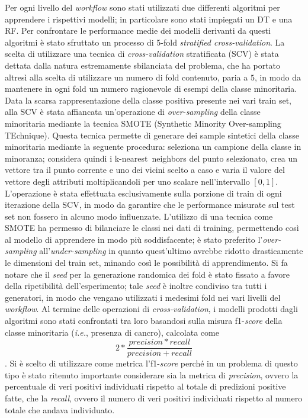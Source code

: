 Per ogni livello del \textit{workflow} sono stati utilizzati due differenti algoritmi per apprendere i rispettivi modelli; in particolare sono stati impiegati un DT e una RF.
Per confrontare le performance medie dei modelli derivanti da questi algoritmi è stato sfruttato un processo di 5-fold \textit{stratified cross-validation}.
La scelta di utilizzare una tecnica di \textit{cross-validation} stratificata (SCV) è stata dettata dalla natura estremamente sbilanciata del problema, che ha portato altresì alla scelta di utilizzare un numero di fold contenuto, paria a $5$, in modo da mantenere in ogni fold un numero ragionevole di esempi della classe minoritaria.
Data la scarsa rappresentazione della classe positiva presente nei vari train set, alla SCV è stata affiancata un'operazione di \textit{over-sampling} della classe minoritaria mediante la tecnica SMOTE (Synthetic Minority Over-sampling TEchnique). 
Questa tecnica permette di generare dei sample sintetici della classe minoritaria mediante la seguente procedura: seleziona un campione della classe in minoranza; considera quindi i k-nearest neighbors del punto selezionato, crea un vettore tra il punto corrente e uno dei vicini scelto a caso e varia il valore del vettore degli attributi moltiplicandoli per uno scalare nell'intervallo $[0, 1]$.
L'operazione è stata effettuata esclusivamente sulla porzione di train di ogni iterazione della SCV, in modo da garantire che le performance misurate sul test set non fossero in alcuno modo influenzate.
L'utilizzo di una tecnica come SMOTE ha permesso di bilanciare le classi nei dati di training, permettendo così al modello di apprendere in modo più soddisfacente; è stato preferito l'\textit{over-sampling} all'\textit{under-sampling} in quanto quest'ultimo avrebbe ridotto drasticamente le dimensioni del train set, minando così le possibilità di apprendimento.
Si fa notare che il \textit{seed} per la generazione randomica dei fold è stato fissato a favore della ripetibilità dell'esperimento; tale \textit{seed} è inoltre condiviso tra tutti i generatori, in modo che vengano utilizzati i medesimi fold nei vari livelli del \textit{workflow}.
Al termine delle operazioni di \textit{cross-validation}, i modelli prodotti dagli algoritmi sono stati confrontati tra loro basandosi sulla misura f1-\textit{score} della classe minoritaria (\textit{i.e.}, presenza di cancro), calcolata come \[2 * \frac{precision*recall}{precision+recall}\].
Si è scelto di utilizzare come metrica l'f1-\textit{score} perché in un problema di questo tipo è stato ritenuto importante considerare sia la metrica di \textit{precision}, ovvero la percentuale di veri positivi individuati rispetto al totale di predizioni positive fatte, che la \textit{recall}, ovvero il numero di veri positivi individuati rispetto al numero totale che andava individuato. 

